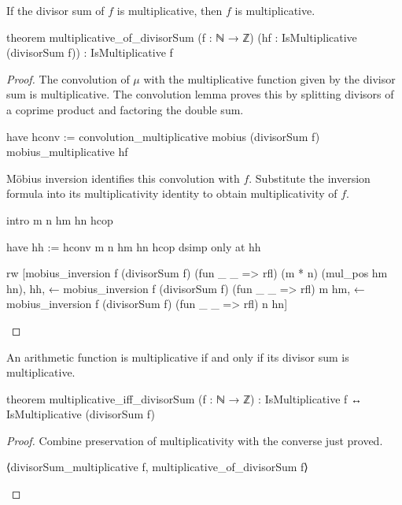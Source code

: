\begin{theorem}
  \label{ent:thm:multiplicative-of-divisorsum}
  If the divisor sum of $f$ is multiplicative, then $f$ is multiplicative.

  \begin{lean}
    theorem multiplicative_of_divisorSum (f : ℕ → ℤ)
        (hf : IsMultiplicative (divisorSum f)) : IsMultiplicative f
  \end{lean}
\end{theorem}

\begin{proof}
  The convolution of $\mu$ with the multiplicative function given by the divisor sum is
  multiplicative.
  The convolution lemma proves this by splitting divisors of a coprime product and factoring the
  double sum.

  \begin{lean}
    have hconv := convolution_multiplicative mobius (divisorSum f) mobius_multiplicative hf
  \end{lean}

  M\"obius inversion identifies this convolution with $f$.
  Substitute the inversion formula into its multiplicativity identity to obtain multiplicativity of
  $f$.

  \begin{lean}
    intro m n hm hn hcop

    have hh := hconv m n hm hn hcop
    dsimp only at hh

    rw [mobius_inversion f (divisorSum f) (fun _ _ => rfl) (m * n) (mul_pos hm hn),
      hh,
      ← mobius_inversion f (divisorSum f) (fun _ _ => rfl) m hm,
      ← mobius_inversion f (divisorSum f) (fun _ _ => rfl) n hn]
  \end{lean}
\end{proof}

\begin{theorem}
  \label{ent:thm:multiplicative-iff-divisorsum}
  An arithmetic function is multiplicative if and only if its divisor sum is multiplicative.

  \begin{lean}
    theorem multiplicative_iff_divisorSum (f : ℕ → ℤ) :
        IsMultiplicative f ↔ IsMultiplicative (divisorSum f)
  \end{lean}
\end{theorem}

\begin{proof}
  Combine preservation of multiplicativity with the converse just proved.

  \begin{lean}
    ⟨divisorSum_multiplicative f, multiplicative_of_divisorSum f⟩
  \end{lean}
\end{proof}

